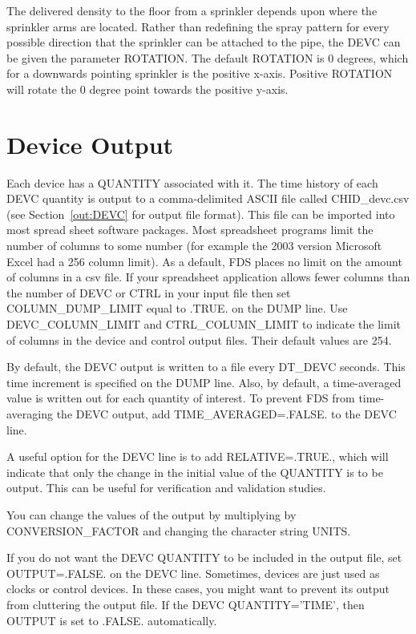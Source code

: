 \documentclass[11pt]{book}
\begin{document}
The delivered density to the floor from a sprinkler depends upon where the sprinkler arms are located.  Rather than redefining the spray pattern for every possible direction that the sprinkler can be attached to the pipe, the {\ct DEVC} can be given the parameter {\ct ROTATION}.  The default {\ct ROTATION} is 0 degrees, which for a downwards pointing sprinkler is the positive x-axis.  Positive {\ct ROTATION} will rotate the 0 degree point towards the positive y-axis.

\section{Device Output}
\label{info:out:DEVC}

Each device has a {\ct QUANTITY} associated with it.
The time history of each {\ct DEVC} quantity is output to a comma-delimited
ASCII file called {\ct CHID\_devc.csv}
(see Section~\ref{out:DEVC} for output file format).
This file can be imported into most spread sheet software packages.  Most spreadsheet programs limit the number of columns to some number (for example the 2003 version Microsoft Excel had a 256 column limit).  As a default, FDS places no limit on the amount of columns in a csv file.  If your spreadsheet application allows fewer columns than the number of {\ct DEVC} or {\ct CTRL} in your input file then set {\ct COLUMN\_DUMP\_LIMIT} equal to {\ct .TRUE.} on the {\ct DUMP} line.
Use {\ct DEVC\_COLUMN\_LIMIT} and {\ct CTRL\_COLUMN\_LIMIT} to indicate the limit of columns in the
device and control output files. Their default values are 254.

By default, the {\ct DEVC} output is written to a file every {\ct DT\_DEVC} seconds.
This time increment is specified on the {\ct DUMP} line. Also, by default,
a time-averaged value is written out for each quantity of interest. To prevent FDS from time-averaging the {\ct DEVC} output, add
{\ct TIME\_AVERAGED=.FALSE.} to the {\ct DEVC} line.

A useful option for the {\ct DEVC} line is to add {\ct RELATIVE=.TRUE.}, which will indicate that only the change in
the initial value of the {\ct QUANTITY} is to be output. This can be useful for verification and validation studies.

You can change the values of the output by multiplying by {\ct CONVERSION\_FACTOR} and changing the character string {\ct UNITS}.

If you do not want the {\ct DEVC} {\ct QUANTITY} to be included in the output file, set {\ct OUTPUT=.FALSE.} on the {\ct DEVC} line. Sometimes, devices are just used as clocks or control devices. In these cases, you might want to prevent its output from cluttering the output file. If the {\ct DEVC} {\ct QUANTITY='TIME'}, then {\ct OUTPUT} is set to {\ct .FALSE.} automatically.
\end{document}
